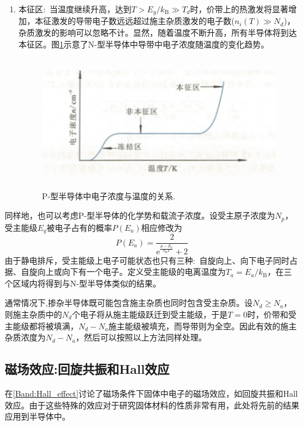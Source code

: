 \begin{enumerate}
\item 本征区:~当温度继续升高，达到$T>E_g/k_{\mathrm{B}}\gg T_d$时，价带上的热激发将显著增加，本征激发的导带电子数远远超过施主杂质激发的电子数($n_i(T)\gg N_d$)，杂质激发的影响可以忽略不计。显然，随着温度不断升高，所有半导体将到达本征区。图\ref{Fig:N-conductor_density}示意了N-型半导体中导带中电子浓度随温度的变化趋势。
\begin{figure}[h!]
\centering
\vspace*{-0.10in}
\includegraphics[height=2.30in,width=4.30in,viewport=0 0 85 45,clip]{Figures/N-semi_conductor-density.png}
\caption{\small \textrm{P-型半导体中电子浓度与温度的关系.}}%
\label{Fig:N-conductor_density}
\end{figure}
\end{enumerate} 
同样地，也可以考虑P-型半导体的化学势和载流子浓度。设受主原子浓度为$N_p$，受主能级$E_g$被电子占有的概率$P(E_a)$相应修改为
\begin{equation}
	P(E_a)=\dfrac2{\mathrm{e}^{\frac{\mu-E_a}{k_{\mathrm{B}}T}}+2}
	\label{eq:P-semi-conductor-probality}
\end{equation}
由于静电排斥，受主能级上电子可能状态也只有三种:~自旋向上、向下电子同时占据、自旋向上或向下有一个电子。定义受主能级的电离温度为$T_a=E_a/k_{\mathrm{B}}$，在三个区域内将得到与N-型半导体类似的结果。

通常情况下,掺杂半导体既可能包含施主杂质也同时包含受主杂质。设$N_d\geqslant N_a$，则施主杂质中的$N_d$个电子将从施主能级跃迁到受主能级，于是$T=0$时，价带和受主能级都将被填满，$N_d-N_a$施主能级被填充，而导带则为全空。因此有效的施主杂质浓度为$N_d-N_a$，然后可以按照以上方法同样处理。

\subsection{磁场效应:回旋共振和Hall效应} 
在\ref{Band:Hall_effect}讨论了磁场条件下固体中电子的磁场效应，如回旋共振和Hall效应。由于这些特殊的效应对于研究固体材料的性质非常有用，此处将先前的结果应用到半导体中。

